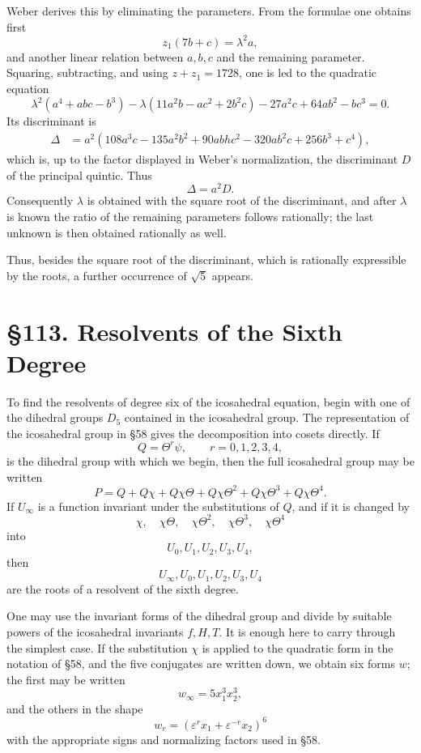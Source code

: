 \documentclass[12pt,a4paper]{article}
\newcommand{\webersection}[2]{\clearpage\section*{\S #1. #2}\addcontentsline{toc}{section}{\S #1. #2}}
\begin{document}
Weber derives this by eliminating the parameters.  From the formulae one obtains first
\begin{equation}
 z_1(7b+c)=\lambda^2 a,
\end{equation}
and another linear relation between $a,b,c$ and the remaining parameter.  Squaring, subtracting, and using $z+z_1=1728$, one is led to the quadratic equation
\begin{equation}
 \lambda^2(a^4+abc-b^3)-\lambda(11a^2b-ac^2+2b^2c)
      -27a^2c+64ab^2-bc^3=0.
\end{equation}
Its discriminant is
\begin{align}
 \Delta&=a^2(108a^3c-135a^2b^2+90abhc^2-320ab^2c+256b^3+c^4),
\end{align}
which is, up to the factor displayed in Weber's normalization, the discriminant $D$ of the principal quintic.  Thus
\begin{equation}
 \Delta=a^2D.
\end{equation}
Consequently $\lambda$ is obtained with the square root of the discriminant, and after $\lambda$ is known the ratio of the remaining parameters follows rationally; the last unknown is then obtained rationally as well.

Thus, besides the square root of the discriminant, which is rationally expressible by the roots, a further occurrence of $\sqrt5$ appears.

\webersection{113}{Resolvents of the Sixth Degree}

To find the resolvents of degree six of the icosahedral equation, begin with one of the dihedral groups $D_5$ contained in the icosahedral group.  The representation of the icosahedral group in \S 58 gives the decomposition into cosets directly.  If
\begin{equation}
 Q=\Theta^r\psi,
 \qquad r=0,1,2,3,4,
\end{equation}
is the dihedral group with which we begin, then the full icosahedral group may be written
\begin{equation}
 P=Q+Q\chi+Q\chi\Theta+Q\chi\Theta^2+Q\chi\Theta^3+Q\chi\Theta^4.
\end{equation}
If $U_\infty$ is a function invariant under the substitutions of $Q$, and if it is changed by
\[
 \chi,\quad \chi\Theta,
 \quad\chi\Theta^2,
 \quad\chi\Theta^3,
 \quad\chi\Theta^4
\]
into
\[
 U_0,U_1,U_2,U_3,U_4,
\]
then
\[
 U_\infty,U_0,U_1,U_2,U_3,U_4
\]
are the roots of a resolvent of the sixth degree.

One may use the invariant forms of the dihedral group and divide by suitable powers of the icosahedral invariants $f,H,T$.  It is enough here to carry through the simplest case.  If the substitution $\chi$ is applied to the quadratic form in the notation of \S 58, and the five conjugates are written down, we obtain six forms $w$; the first may be written
\begin{equation}
 w_\infty=5x_1^3x_2^3,
\end{equation}
and the others in the shape
\begin{equation}
 w_r=(\varepsilon^r x_1+\varepsilon^{-r}x_2)^6
\end{equation}
with the appropriate signs and normalizing factors used in \S 58.
\end{document}
